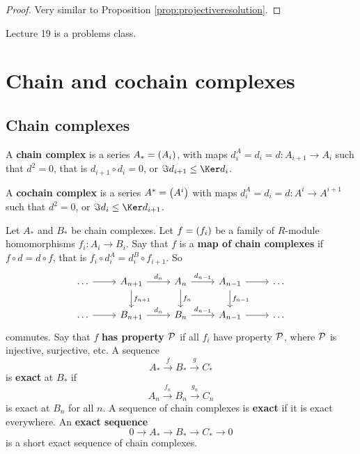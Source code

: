 \begin{proof}
Very similar to Proposition \ref{prop:projectiveresolution}.
\end{proof}


Lecture 19 is a problems class.

\pagebreak

\section{Chain and cochain complexes}

\subsection{Chain complexes}


\begin{definition}
A \textbf{chain complex} is a series $ A_* = \br{A_i} $, with maps $ d_i^A = d_i = d : A_{i + 1} \to A_i $ such that $ d^2 = 0 $, that is $ d_{i + 1} \circ d_i = 0 $, or $ \Im d_{i + 1} \le \Ker d_i $.
\end{definition}

\begin{definition}
A \textbf{cochain complex} is a series $ A^* = \br{A^i} $ with maps $ d_i^A = d_i = d : A^i \to A^{i + 1} $ such that $ d^2 = 0 $, or $ \Im d_i \le \Ker d_{i + 1} $.
\end{definition}

Let $ A_* $ and $ B_* $ be chain complexes. Let $ f = \br{f_i} $ be a family of $ R $-module homomorphisms $ f_i : A_i \to B_i $. Say that $ f $ is a \textbf{map of chain complexes} if $ f \circ d = d \circ f $, that is $ f_i \circ d_i^A = d_i^B \circ f_{i + 1} $. So
$$
\begin{tikzcd}
\dots \arrow{r} & A_{n + 1} \arrow{r}{d_n} \arrow{d}{f_{n + 1}} & A_n \arrow{r}{d_{n - 1}} \arrow{d}{f_n} & A_{n - 1} \arrow{r} \arrow{d}{f_{n - 1}} & \dots \\
\dots \arrow{r} & B_{n + 1} \arrow{r}{d_n} & B_n \arrow{r}{d_{n - 1}} & A_{n - 1} \arrow{r} & \dots
\end{tikzcd}
$$
commutes. Say that $ f $ \textbf{has property $ \mathcal{P} $} if all $ f_i $ have property $ \mathcal{P} $, where $ \mathcal{P} $ is injective, surjective, etc. A sequence
$$ A_* \xrightarrow{f} B_* \xrightarrow{g} C_* $$
is \textbf{exact} at $ B_* $ if
$$ A_n \xrightarrow{f_n} B_n \xrightarrow{g_n} C_n $$
is exact at $ B_n $ for all $ n $. A sequence of chain complexes is \textbf{exact} if it is exact everywhere. An \textbf{exact sequence}
$$ 0 \to A_* \to B_* \to C_* \to 0 $$
is a short exact sequence of chain complexes.

